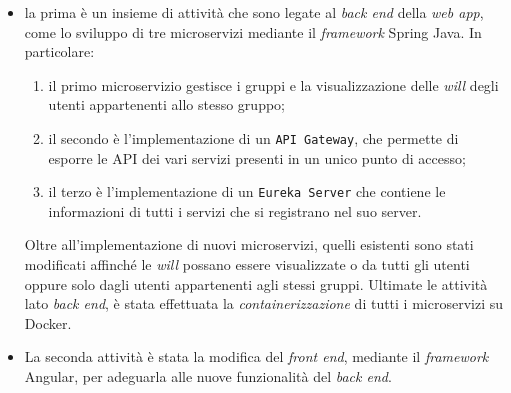 \begin{itemize}
      \item la prima è un insieme di attività che sono legate al \textit{back
                  end} della \textit{web app}, come lo sviluppo di tre
            microservizi
            mediante il \textit{framework} Spring Java.
            In particolare:
            \begin{enumerate}
                  \item il primo microservizio	gestisce i gruppi e la
                        visualizzazione delle
                        \textit{will}
                        degli utenti appartenenti allo stesso gruppo;
                  \item il secondo è l'implementazione di un
                        \texttt{API Gateway}, che permette di esporre le
                        API dei vari servizi
                        presenti in un
                        unico punto di accesso;
                  \item il terzo è l'implementazione di un \texttt{Eureka
                              Server}
                        che
                        contiene le informazioni di tutti i servizi che si
                        registrano nel suo server.
            \end{enumerate}
            Oltre all'implementazione di nuovi microservizi, quelli
            esistenti
            sono stati modificati affinché le \textit{will} possano
            essere visualizzate o da tutti gli utenti oppure solo dagli utenti
            appartenenti agli stessi gruppi.
            Ultimate le attività lato \textit{back end}, è stata effettuata la
            \textit{containerizzazione} di tutti i microservizi su
            Docker.
      \item La seconda attività è stata la modifica del \textit{front end},
            mediante il \textit{framework} Angular, per adeguarla alle nuove
            funzionalità del
            \textit{back end}.
\end{itemize}

%
%

\endgroup

\vfill